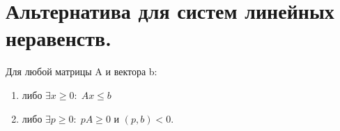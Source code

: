 \chapter{Альтернатива для систем линейных неравенств.}\label{cha:14}

\begin{theorem}
	Для любой матрицы A и вектора b:
	\begin{enumerate}
		\item либо $\exists x \geq 0: \; Ax \leq b$
		\item либо $\exists p \geq 0: \; pA \geq 0$ и $(p, b) < 0.$ 
	\end{enumerate}
\end{theorem}

